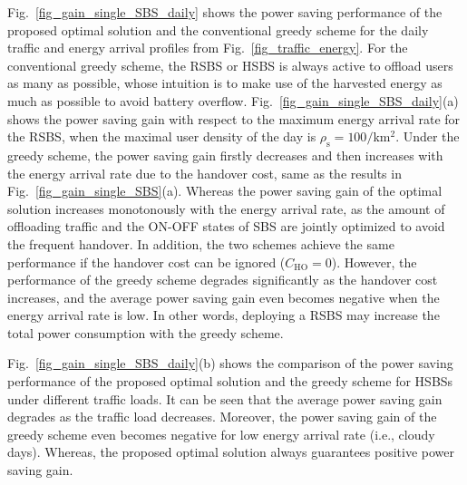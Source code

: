 \documentclass[12pt, draftclsnofoot,onecolumn]{IEEEtran}
\begin{document}
    \begin{figure*}[!t]
        \centering
        \hspace{2mm}
        \hfil
        \caption{Average power saving gain of single SBS under daily traffic and energy profiles.}
        \label{fig_gain_single_SBS_daily}
    \end{figure*}

Fig.~\ref{fig_gain_single_SBS_daily} shows the power saving performance of the proposed optimal solution and the conventional greedy scheme for the daily traffic and energy arrival profiles from Fig.~\ref{fig_traffic_energy}. For the conventional greedy scheme, the RSBS or HSBS is always active to offload users as many as possible, whose intuition is to make use of the harvested energy as much as possible to avoid battery overflow. Fig.~\ref{fig_gain_single_SBS_daily}(a) shows the power saving gain with respect to the maximum energy arrival rate for the RSBS, when the maximal user density of the day is $\rho_\mathrm{s} = 100/$km$^2$.
Under the greedy scheme, the power saving gain firstly decreases and then increases with the energy arrival rate due to the handover cost, same as the results in Fig.~\ref{fig_gain_single_SBS}(a). Whereas the power saving gain of the optimal solution increases monotonously with the energy arrival rate, as the amount of offloading traffic and the ON-OFF states of SBS are jointly optimized to avoid the frequent handover.
In addition, the two schemes achieve the same performance if the handover cost can be ignored ($C_\mathrm{HO}=0$). However, the performance of the greedy scheme degrades significantly as the handover cost increases, and the average power saving gain even becomes negative when the energy arrival rate is low. In other words, deploying a RSBS may increase the total power consumption with the greedy scheme.

Fig.~\ref{fig_gain_single_SBS_daily}(b) shows the comparison of the power saving performance of the proposed optimal solution and the greedy scheme for HSBSs under different traffic loads. It can be seen that the average power saving gain degrades as the traffic load decreases. Moreover, the power saving gain of the greedy scheme even becomes negative for low energy arrival rate (i.e., cloudy days).
Whereas, the proposed optimal solution always guarantees positive power saving gain.
\end{document}

